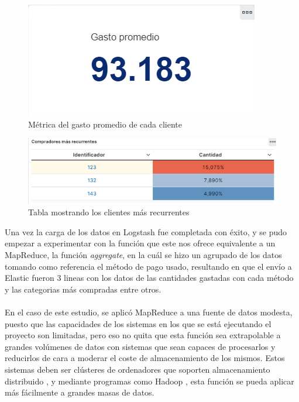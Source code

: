\begin{figure}
    \centering
    \includegraphics[width=1\linewidth]{img/metrica2.png}
    \caption{Métrica del gasto promedio de cada cliente}
    \label{fig:metrica2}
\end{figure}

\begin{figure}
    \centering
    \includegraphics[width=1\linewidth]{img/tabla2.png}
    \caption{Tabla mostrando los clientes más recurrentes}
    \label{fig:tabla2}
\end{figure}


Una vez la carga de los datos en Logstash fue completada con éxito, y se pudo empezar a experimentar con la función que este nos ofrece equivalente a un MapReduce, la función \textit{aggregate}, en la cuál se hizo un agrupado de los datos tomando como referencia el método de pago usado, resultando en que el envío a Elastic fueron 3 lineas con los datos de las cantidades gastadas con cada método y las categorias más compradas entre otros.

\paragraph{}
\paragraph{}

En el caso de este estudio, se aplicó MapReduce a una fuente de datos modesta, puesto que las capacidades de los sistemas en los que se está ejecutando el proyecto son limitadas, pero eso no quita que esta función sea extrapolable a grandes volúmenes de datos con sistemas que sean capaces de procesarlos y reducirlos de cara a moderar el coste de almacenamiento de los mismos. Estos sistemas deben ser clústeres de ordenadores que soporten almacenamiento distribuido , y mediante programas como Hadoop \cite{Hadoop}, esta función se pueda aplicar más fácilmente a grandes masas de datos.

